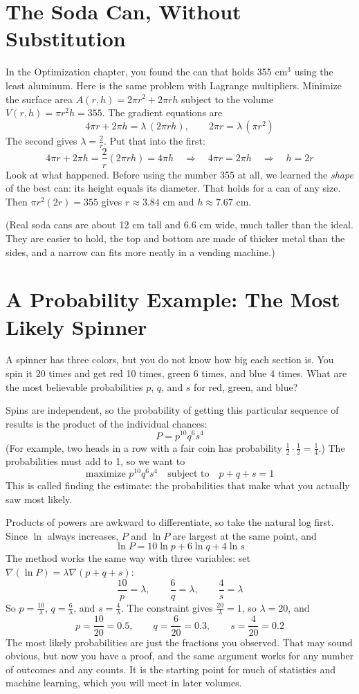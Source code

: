 \section{The Soda Can, Without Substitution}
In the Optimization chapter, you found the can that holds 355 cm$^3$ using the least
aluminum. Here is the same problem with Lagrange multipliers. Minimize the surface
area $A(r, h) = 2\pi r^2 + 2\pi rh$ subject to the volume $V(r, h) = \pi r^2 h = 355$.
The gradient equations are
$$4\pi r + 2\pi h = \lambda\,(2\pi rh), \qquad 2\pi r = \lambda\,(\pi r^2)$$
The second gives $\lambda = \frac{2}{r}$. Put that into the first:
$$4\pi r + 2\pi h = \frac{2}{r}(2\pi rh) = 4\pi h \quad\Longrightarrow\quad 4\pi r = 2\pi h \quad\Longrightarrow\quad h = 2r$$
Look at what happened. Before using the number 355 at all, we learned the
\emph{shape} of the best can: its height equals its diameter. That holds for a can of
any size. Then $\pi r^2(2r) = 355$ gives $r \approx 3.84$ cm and $h \approx 7.67$ cm.

(Real soda cans are about 12 cm tall and 6.6 cm wide, much taller than the ideal.
They are easier to hold, the top and bottom are made of thicker metal than the
sides, and a narrow can fits more neatly in a vending machine.)

\section{A Probability Example: The Most Likely Spinner}
A spinner has three colors, but you do not know how big each section is. You spin it
20 times and get red 10 times, green 6 times, and blue 4 times. What are the most
believable probabilities $p$, $q$, and $s$ for red, green, and blue?

Spins are independent, so the probability of getting this particular sequence of
results is the product of the individual chances:
$$P = p^{10} q^{6} s^{4}$$
(For example, two heads in a row with a fair coin has probability
$\frac{1}{2} \cdot \frac{1}{2} = \frac{1}{4}$.) The probabilities must add to 1, so we
want to
$$\text{maximize } p^{10}q^{6}s^{4} \quad\text{subject to}\quad p + q + s = 1$$
This is called finding the  estimate: the probabilities that
make what you actually saw most likely.

Products of powers are awkward to differentiate, so take the natural log first. Since
$\ln$ always increases, $P$ and $\ln P$ are largest at the same point, and
$$\ln P = 10\ln p + 6\ln q + 4\ln s$$
The method works the same way with three variables: set
$\nabla(\ln P) = \lambda\nabla(p + q + s)$:
$$\frac{10}{p} = \lambda, \qquad \frac{6}{q} = \lambda, \qquad \frac{4}{s} = \lambda$$
So $p = \frac{10}{\lambda}$, $q = \frac{6}{\lambda}$, and $s = \frac{4}{\lambda}$. The constraint
gives $\frac{20}{\lambda} = 1$, so $\lambda = 20$, and
$$p = \frac{10}{20} = 0.5, \qquad q = \frac{6}{20} = 0.3, \qquad s = \frac{4}{20} = 0.2$$
The most likely probabilities are just the fractions you observed. That may sound
obvious, but now you have a proof, and the same argument works for any number of
outcomes and any counts. It is the starting point for much of statistics and machine
learning, which you will meet in later volumes.

